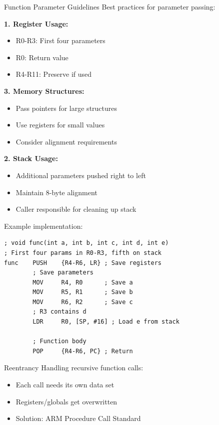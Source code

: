 \begin{KR}{Function Parameter Guidelines}
Best practices for parameter passing:

\begin{minipage}[t]{0.45\textwidth}  
\textbf{1. Register Usage:}
\begin{itemize}
  \item R0-R3: First four parameters
  \item R0: Return value
  \item R4-R11: Preserve if used
\end{itemize}
\end{minipage}
\begin{minipage}[t]{0.54\textwidth}
  \textbf{3. Memory Structures:}
\begin{itemize}
  \item Pass pointers for large structures
  \item Use registers for small values
  \item Consider alignment requirements
\end{itemize}
\end{minipage}

\textbf{2. Stack Usage:}
\begin{itemize}
  \item Additional parameters pushed right to left
  \item Maintain 8-byte alignment
  \item Caller responsible for cleaning up stack
\end{itemize}



Example implementation:
\begin{lstlisting}[language=armasm, style=basesmol]
; void func(int a, int b, int c, int d, int e)
; First four params in R0-R3, fifth on stack
func    PUSH    {R4-R6, LR} ; Save registers
        ; Save parameters
        MOV     R4, R0      ; Save a
        MOV     R5, R1      ; Save b
        MOV     R6, R2      ; Save c
        ; R3 contains d
        LDR     R0, [SP, #16] ; Load e from stack
        
        ; Function body
        POP     {R4-R6, PC} ; Return
\end{lstlisting}
\end{KR}

\begin{concept}{Reentrancy}
Handling recursive function calls:
\begin{itemize}
  \item Each call needs its own data set
  \item Registers/globals get overwritten
  \item Solution: ARM Procedure Call Standard
\end{itemize}
\end{concept}

